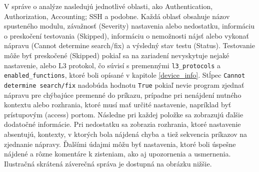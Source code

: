 V správe o analýze nasledujú jednotlivé oblasti, ako Authentication, Authorization, Accounting; SSH a podobne. Každá oblasť obsahuje názov spusteného modulu, závažnosť (Severity) nastavenia alebo nedostatku, informáciu o preskočení testovania (Skipped), informáciu o nemožnosti nájsť alebo vykonať nápravu (Cannot determine search/fix) a výsledný stav testu (Status). Testovanie môže byť preskočené (Skipped) pokiaľ sa na zariadení nevyskytuje nejaké nastavenie, alebo L3 protokol, čo súvisí s premennými \texttt{l3\_protocols} a \texttt{enabled\_functions}, ktoré boli opísané v kapitole \ref{device_info}. Stĺpec \texttt{Cannot determine search/fix} nadobúda hodnotu \texttt{True} pokiaľ nevie program zjednať nápravu pre chýbajúce premenné do príkazu, prípadne pri nenájdení nutného kontextu alebo rozhrania, ktoré musí mať určité nastavenie, napríklad byť prístupovým (access) portom. Následne pri každej položke sa zobrazujú ďalšie dodatočné informácie. Pri nedostatku sa zobrazia rozhrania, ktoré nastavenie absentujú, kontexty, v ktorých bola nájdená chyba a tiež sekvencia príkazov na zjednanie nápravy. Ďalšími údajmi môžu byť nastavenia, ktoré boli úspešne nájdené a rôzne komentáre k zisteniam, ako aj upozornenia a usmernenia. Ilustračná skrátená záverečná správa je dostupná na obrázku nižšie.
